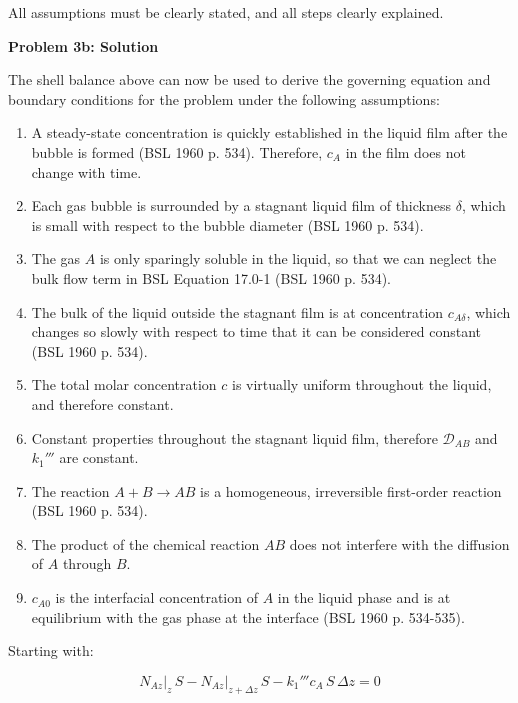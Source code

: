 \documentclass[letterpaper,12pt]{article}
\begin{document}
All assumptions must be clearly stated, and all steps clearly explained.

\vspace{6pt}

\textbf{Problem 3b: Solution}

\vspace{6pt}

The shell balance above can now be used to derive the governing equation and boundary conditions for the problem under the following assumptions:

\begin{enumerate}
    \item A steady-state concentration is quickly established in the liquid film after the bubble is formed (BSL 1960 p. 534). Therefore, $c_A$ in the film does not change with time.
    \item Each gas bubble is surrounded by a stagnant liquid film of thickness $\delta$, which is small with respect to the bubble diameter (BSL 1960 p. 534).
    \item The gas $A$ is only sparingly soluble in the liquid, so that we can neglect the bulk flow term in BSL Equation 17.0-1 (BSL 1960 p. 534).
    \item The bulk of the liquid outside the stagnant film is at concentration $c_{A \delta}$, which changes so slowly with respect to time that it can be considered constant (BSL 1960 p. 534).
    \item The total molar concentration $c$ is virtually uniform throughout the liquid, and therefore constant. 
    \item Constant properties throughout the stagnant liquid film, therefore $\mathcal{D}_{AB}$ and $k_1'''$ are constant.
    \item The reaction $A + B \to AB$ is a homogeneous, irreversible first-order reaction (BSL 1960 p. 534).
    \item The product of the chemical reaction $AB$ does not interfere with the diffusion of $A$ through $B$.
    \item $c_{A0}$ is the interfacial concentration of $A$ in the liquid phase and is at equilibrium with the gas phase at the interface (BSL 1960 p. 534-535).
\end{enumerate}

Starting with:

\begin{equation}
    N_{Az}\big|_{z}\, S - N_{Az}\big|_{z+\Delta z}\, S - k_1''' c_A\, S\, \Delta z = 0
\end{equation}
\end{document}
